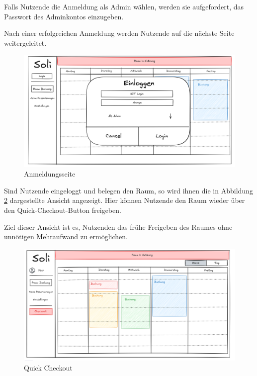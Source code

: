 Falls Nutzende die Anmeldung als Admin wählen, werden sie aufgefordert, das Passwort des Adminkontos einzugeben.

Nach einer erfolgreichen Anmeldung werden Nutzende auf die nächste Seite weitergeleitet.

\begin{figure}[ht]
    \centering
    \includegraphics[width=\textwidth]{figures/ui/anmeldungsseite}
    \caption{Anmeldungsseite}
    \label{fig:login}
\end{figure}
\clearpage

Sind Nutzende eingeloggt und belegen den Raum,
so wird ihnen die in Abbildung \ref{fig:checkout} dargestellte Ansicht angezeigt.
Hier können Nutzende den Raum wieder über den Quick-Checkout-Button freigeben.


Ziel dieser Ansicht ist es, Nutzenden das frühe Freigeben des Raumes ohne unnötigen Mehraufwand zu ermöglichen.
\begin{figure}[ht]
    \centering
    \includegraphics[width=\textwidth]{figures/ui/checkout}
    \caption{Quick Checkout}
    \label{fig:checkout}
\end{figure}
\clearpage

